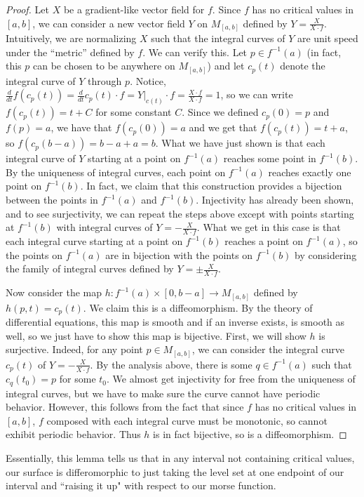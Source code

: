 \documentclass[12pt]{article}
\theoremstyle{definition}
\begin{document}
\begin{proof}
      Let $X$ be a gradient-like vector field for $f$. Since $f$ has no critical values in $[a,b]$, we can consider a new vector field $Y$ on $M_{[a,b]}$ defined by $Y = \frac{X}{X\cdot f}$. Intuitively, we are normalizing $X$ such that the integral curves of $Y$ are unit speed under the ``metric'' defined by $f$. We can verify this. Let $p \in f^{-1}(a)$ (in fact, this $p$ can be chosen to be anywhere on $M_{[a,b]}$) and let $c_p(t)$ denote the integral curve of $Y$ through $p$. Notice, $\frac{d}{dt}f(c_p(t)) = \frac{d}{dt}c_p(t)\cdot f = Y|_{c(t)}\cdot f = \frac{X\cdot f}{X \cdot f} = 1$, so we can write $f(c_p(t)) = t + C$ for some constant $C$. Since we defined $c_p(0) = p$ and $f(p)=a$, we have that $f(c_p(0)) =a $ and we get that $f(c_p(t))=t+a$, so $f(c_p(b-a)) = b-a+a = b$. What we have just shown is that each integral curve of $Y$ starting at a point on $f^{-1}(a)$ reaches some point in $f^{-1}(b)$. By the uniqueness of integral curves, each point on $f^{-1}(a)$ reaches exactly one point on $f^{-1}(b)$. In fact, we claim that this construction provides a bijection between the points in $f^{-1}(a)$ and $f^{-1}(b)$. Injectivity has already been shown, and to see surjectivity, we can repeat the steps above except with points starting at $f^{-1}(b)$ with integral curves of $Y = -\frac{X}{X\cdot f}$. What we get in this case is that each integral curve starting at a point on $f^{-1}(b)$ reaches a point on $f^{-1}(a)$, so the points on $f^{-1}(a)$ are in bijection with the points on $f^{-1}(b)$ by considering the family of integral curves defined by $Y = \pm\frac{X}{X\cdot f}$.

      Now consider the map $h:f^{-1}(a)\times [0,b-a] \rightarrow M_{[a,b]}$ defined by $h(p,t) = c_p(t)$. We claim this is a diffeomorphism. By the theory of differential equations, this map is smooth and if an inverse exists, is smooth as well, so we just have to show this map is bijective. First, we will show $h$ is surjective. Indeed, for any point $p \in M_{[a,b]}$, we can consider the integral curve $c_p(t)$ of $Y = -\frac{X}{X\cdot f}$. By the analysis above, there is some $q \in f^{-1}(a)$ such that $c_q(t_0)=p$ for some $t_0$. We almost get injectivity for free from the uniqueness of integral curves, but we have to make sure the curve cannot have periodic behavior. However, this follows from the fact that since $f$ has no critical values in $[a,b]$, $f$ composed with each integral curve must be monotonic, so cannot exhibit periodic behavior. Thus $h$ is in fact bijective, so is a diffeomorphism. 
\end{proof}
	Essentially, this lemma tells us that in any interval not containing critical values, our surface is differomorphic to just taking the level set at one endpoint of our interval and ``raising it up" with respect to our morse function. 
\end{document}
